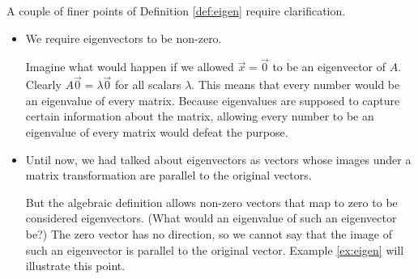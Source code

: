 \documentclass{ximera}
\begin{document}
\begin{observation}\label{obs:finerPointsOfEigDef}
A couple of finer points of Definition \ref{def:eigen} require clarification.
    \begin{itemize}
    \item We require eigenvectors to be non-zero.  
    
    Imagine what would happen if we allowed $\vec{x}=\vec{0}$ to be an eigenvector of $A$. Clearly $A\vec{0}=\lambda\vec{0}$ for all scalars $\lambda$.  This means that every number would be an eigenvalue of every matrix.  Because eigenvalues are supposed to capture certain information about the matrix, allowing every number to be an eigenvalue of every matrix would defeat the purpose.
    \item Until now, we had talked about  eigenvectors as vectors whose images under a matrix transformation are parallel to the original vectors.  
    
    But the algebraic definition allows non-zero vectors that map to zero to be considered eigenvectors.  (What would an eigenvalue of such an eigenvector be?)  The zero vector has no direction, so we cannot say that the image of such an eigenvector is parallel to the original vector.  Example \ref{ex:eigen} will illustrate this point.
    \end{itemize}
\end{observation}
    
\end{document}
